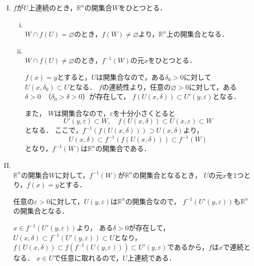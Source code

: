 \begin{tproof}
    \begin{enumerate}[(I)]
        \item
              $f$が$U$上連続のとき，$\mathbb{R}^n$の開集合$W$をひとつとる．
              \begin{enumerate}[(i)]
                  \item \mbox{} \\
                        $ W \cap f(U) = \varnothing$のとき，$f(W) \ne \varnothing$より，$\mathbb{R}^n$上の開集合となる．
                  \item \mbox{} \\
                        $ W \cap f(U) \ne \varnothing$のとき，$f^{-1} (W)$の元$x$をひとつとる．

                        $ f(x)=y$とすると，$U$は開集合なので，ある$\delta_0 >0$に対して$U(x,\delta_0) \subset U$となる．
                        $f$の連続性より，任意の$\varnothing >0$に対して，ある$\delta >0$~（$\delta_0 >\delta >0$）が存在して，
                        $f(U(x,\delta)) \subset U' (y,\varepsilon)$となる．

                        また， $W$は開集合なので，$\varepsilon$を十分小さくとると
                        \[
                            U'(y,\varepsilon) \subset W,\quad f(U(x,\delta)) \subset U (x,\varepsilon) \subset W
                        \]
                        となる．
                        ここで，$f^{-1} (f(U(x,\delta))) \supset U(x,\delta)$より，
                        \[
                            U(x,\delta) \subset f^{-1} (f(U(x,\delta))) \subset f^{-1} (W)
                        \]
                        となり，$f^{-1} (W)$は$\mathbb{R}^n$の開集合である．
              \end{enumerate}
        \item \mbox{} \\
              $ \mathbb{R}^n$の開集合$W$に対して，$f^{-1} (W)$が$\mathbb{R}^n$の開集合となるとき，
              $U$の元$x$を1つとり，$f(x)=y$とする．

              任意の$\varepsilon >0$に対して，$U(y,\varepsilon)$は$\mathbb{R}^n$の開集合なので，
              $f^{-1} (U'(y,\varepsilon))$も$\mathbb{R}^n$の開集合となる．

              $x \in f^{-1} (U'(y,\varepsilon))$より，
              ある$\delta >0$が存在して，$U(x,\delta) \subset  f^{-1}(U'(y,\varepsilon)) \subset U$となり，
              $f(U(x,\delta)) \subset f(f^{-1}(U(y,\varepsilon))) \subset U'(y,\varepsilon)$であるから，$f$は$x$で連続となる．
              $x \in U$で任意に取れるので，$U$上連続である．
    \end{enumerate}
\end{tproof}



